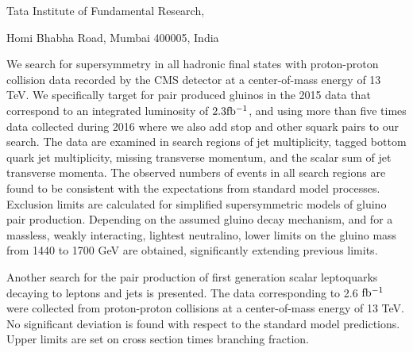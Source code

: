 \begin{titlepage}
\begin{center}
Tata Institute of Fundamental Research,

Homi Bhabha Road, Mumbai 400005, India

\end{center}

\vspace{1.5cm}


We search for supersymmetry in all hadronic final states with proton-proton collision data recorded by the CMS detector at a center-of-mass energy of 13 TeV. We specifically target for pair produced gluinos in the 2015 data that correspond to an integrated luminosity of $\rm 2.3 fb^{-1}$, and using more than five times  data collected during 2016 where we also add stop and other squark pairs to our search. The data are examined in search regions of jet multiplicity, tagged bottom quark jet multiplicity, missing transverse momentum, and the scalar sum of jet transverse momenta. The observed numbers of events in all search regions are found to be consistent with the expectations from standard model processes. Exclusion limits are calculated for simplified supersymmetric models of gluino pair production. Depending on the assumed gluino decay mechanism, and for a massless, weakly interacting, lightest neutralino, lower limits on the gluino mass from 1440 to 1700 GeV are obtained, significantly extending previous limits.

Another search for the pair production of first generation scalar leptoquarks decaying to leptons and jets is presented. The data corresponding to 2.6 $\rm fb^{-1}$ were collected from proton-proton collisions at a center-of-mass energy of 13 TeV. No significant deviation is found with respect to the standard model predictions. Upper limits are set on cross section times branching fraction.  


\end{titlepage}
